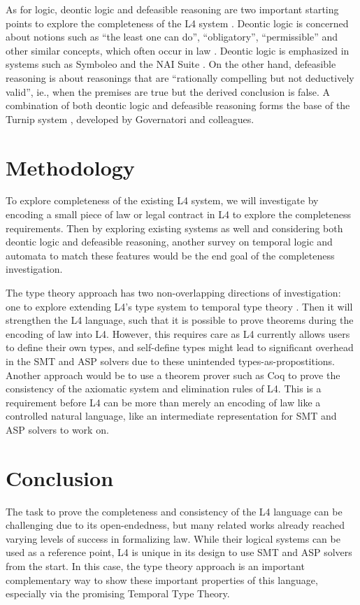 \documentclass[11pt, sigconf]{acmart}
\begin{document}
As for logic, deontic logic and defeasible reasoning are two important starting
points to explore the completeness of the L4 system \cite{smucclaw}. Deontic
logic is concerned about notions such as ``the least one can do'',
``obligatory'', ``permissible'' and other similar concepts, which often occur in
law \cite{sep-logic-deontic}. Deontic logic is emphasized in systems such as
Symboleo \cite{Symboleo} and the NAI Suite
\cite{libal_steen_nai_suite_draft_reason_legal_texts_jurix_2019}. On the other
hand, defeasible reasoning is about reasonings that are ``rationally compelling
but not deductively valid'', ie., when the premises are true but the derived
conclusion is false. A combination of both deontic logic and defeasible
reasoning forms the base of the Turnip system \cite{governatori1,
  Governatori2021UnravelLR}, developed by Governatori and colleagues.

\section{Methodology}
\label{sec:method}
To explore completeness of the existing L4 system, we will investigate by
encoding a small piece of law or legal contract in L4 to explore the
completeness requirements. Then by exploring existing systems as well and
considering both deontic logic and defeasible reasoning, another survey on
temporal logic and automata to match these features would be the end goal of the
completeness investigation.

The type theory approach has two non-overlapping directions of investigation:
one to explore extending L4's type system to temporal type theory
\cite{schultz2017temporal}. Then it will strengthen the L4 language, such that
it is possible to prove theorems during the encoding of law into L4. However,
this requires care as L4 currently allows users to define their own types, and
self-define types might lead to significant overhead in the SMT and ASP solvers
due to these unintended types-as-propostitions. Another approach would be to use
a theorem prover such as Coq to prove the consistency of the axiomatic system
and elimination rules of L4. This is a requirement before L4 can be more than
merely an encoding of law like a controlled natural language, like an
intermediate representation for SMT and ASP solvers to work on.

\section{Conclusion}
\label{sec:conclusion}

The task to prove the completeness and consistency of the L4 language can be
challenging due to its open-endedness, but many related works already reached
varying levels of success in formalizing law. While their logical systems can be
used as a reference point, L4 is unique in its design to use SMT and ASP solvers
from the start. In this case, the type theory approach is an important
complementary way to show these important properties of this language,
especially via the promising Temporal Type Theory.



\end{document}
